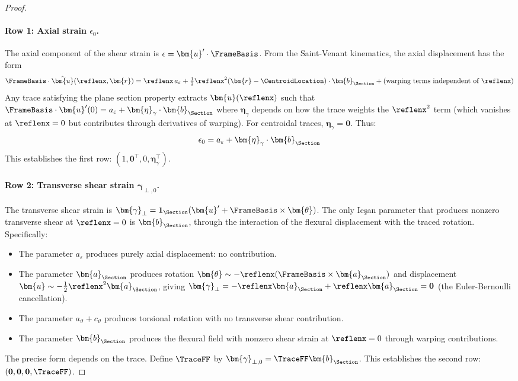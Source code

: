 \begin{Old}
\begin{proof}
\paragraph{Row 1: Axial strain $\epsilon_{0}$.}
The axial component of the shear strain is $\epsilon = \bm{u}' \cdot \FrameBasis$. 
From the Saint-Venant kinematics, the axial displacement has the form
\begin{equation*}
\FrameBasis \cdot \hat{\bm{u}}(\reflenx, \bm{r}) = \reflenx \, a_\varepsilon 
+ \tfrac{1}{2}\reflenx^2 (\bm{r} - \CentroidLocation) \cdot \bm{b}_{\Section} 
+ \text{(warping terms independent of $\reflenx$)}
\end{equation*}
Any trace satisfying the plane section property extracts $\bm{u}(\reflenx)$ such that 
$\FrameBasis \cdot \bm{u}'(0) = a_\varepsilon + \bm{\eta}_\gamma \cdot \bm{b}_{\Section}$ 
where $\bm{\eta}_\gamma$ depends on how the trace weights the $\reflenx^2$ term 
(which vanishes at $\reflenx = 0$ but contributes through derivatives of warping). 
For centroidal traces, $\bm{\eta}_\gamma = \mathbf{0}$. 
Thus:
\begin{equation*}
\epsilon_{0} = a_\varepsilon + \bm{\eta}_\gamma \cdot \bm{b}_{\Section}
\end{equation*}
This establishes the first row: $(1, \mathbf{0}^\top, 0, \bm{\eta}_\gamma^\top)$.

\paragraph{Row 2: Transverse shear strain $\bm{\gamma}_{\perp,0}$.}
The transverse shear strain is $\bm{\gamma}_\perp = \mathbf{1}_{\Section}(\bm{u}' + \FrameBasis \times \bm{\theta})$. 
The only Ieşan parameter that produces nonzero transverse shear at $\reflenx = 0$ 
is $\bm{b}_{\Section}$, through the interaction of the flexural displacement with 
the traced rotation. Specifically:
\begin{itemize}
\item The parameter $a_\varepsilon$ produces purely axial displacement: no contribution.
\item The parameter $\bm{a}_{\Section}$ produces rotation $\bm{\theta} \sim -\reflenx(\FrameBasis \times \bm{a}_{\Section})$ 
and displacement $\bm{u} \sim -\tfrac{1}{2}\reflenx^2 \bm{a}_{\Section}$, giving 
$\bm{\gamma}_\perp = -\reflenx \bm{a}_{\Section} + \reflenx \bm{a}_{\Section} = \mathbf{0}$ 
(the Euler-Bernoulli cancellation).
\item The parameter $a_\vartheta + c_\vartheta$ produces torsional rotation with 
no transverse shear contribution.
\item The parameter $\bm{b}_{\Section}$ produces the flexural field with nonzero 
shear strain at $\reflenx = 0$ through warping contributions.
\end{itemize}
The precise form depends on the trace. Define $\TraceFF$ by 
$\bm{\gamma}_{\perp,0} = \TraceFF \bm{b}_{\Section}$. 
This establishes 
the second row: $(\mathbf{0}, \mathbf{0}, \mathbf{0}, \TraceFF)$.


\end{proof}
\end{Old}
